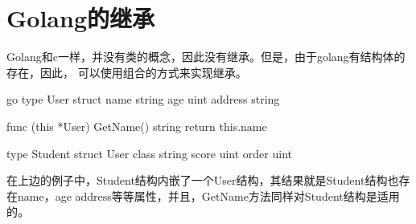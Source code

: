 \section{Golang的继承}
Golang和c一样，并没有类的概念，因此没有继承。但是，由于golang有结构体的存在，因此，
可以使用组合的方式来实现继承。
\begin{code-block}{go}
type User struct{
    name string
    age uint
    address string
}

func (this *User) GetName() string{
    return this.name
}

type Student struct{
    User
    class string
    score uint
    order uint
}
\end{code-block}

在上边的例子中，Student结构内嵌了一个User结构，其结果就是Student结构也存在name，age
address等等属性，并且，GetName方法同样对Student结构是适用的。
